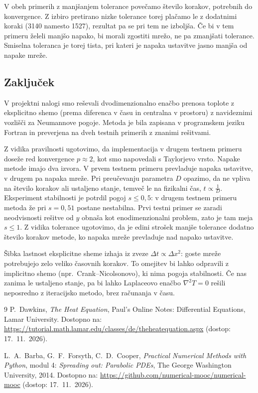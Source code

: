 \documentclass[a4paper,11pt]{article}
\begin{document}
	V obeh primerih z manjšanjem tolerance povečamo število korakov, potrebnih do konvergence. Z izbiro pretirano nizke tolerance torej plačamo le z dodatnimi koraki (3140 namesto 1527), rezultat pa se pri tem ne izboljša. Če bi v tem primeru želeli manjšo napako, bi morali zgostiti mrežo, ne pa zmanjšati tolerance. Smiselna toleranca je torej tista, pri kateri je napaka ustavitve jasno manjša od napake mreže.
	
	\subsection{Zaključek}
	
	V projektni nalogi smo reševali dvodimenzionalno enačbo prenosa toplote z eksplicitno shemo (prema diferenca v času in centralna v prostoru) z navideznimi vozlišči za Neumannove pogoje. Metoda je bila zapisana v programskem jeziku Fortran in preverjena na dveh testnih primerih z znanimi rešitvami.
	
	Z vidika pravilnosti ugotovimo, da implementacija v drugem testnem primeru doseže red konvergence $p \approx 2$, kot smo napovedali s Taylorjevo vrsto. Napake metode imajo dva izvora. V prvem testnem primeru prevladuje napaka ustavitve, v drugem pa napaka mreže. Pri preučevanju parametra $D$ opazimo, da ne vpliva na število korakov ali ustaljeno stanje, temveč le na fizikalni čas, $t \propto \frac{1}{D}$. Eksperiment stabilnosti je potrdil pogoj $s \leq 0{,}5$: v drugem testnem primeru metoda že pri $s = 0{,}51$ postane nestabilna. Prvi testni primer se zaradi neodvisnosti rešitve od $y$ obnaša kot enodimenzionalni problem, zato je tam meja $s \leq 1$. Z vidika tolerance ugotovimo, da je edini strošek manjše tolerance dodatno število korakov metode, ko napaka mreže prevladuje nad napako ustavitve.
	
	Šibka lastnost eksplicitne sheme izhaja iz zveze $\Delta t \propto \Delta x^2$: goste mreže potrebujejo zelo veliko časovnih korakov. To omejitev bi lahko odpravili z implicitno shemo (npr.\ Crank--Nicolsonovo), ki nima pogoja stabilnosti. Če nas zanima le ustaljeno stanje, pa bi lahko Laplaceovo enačbo $\nabla^2 T = 0$ rešili neposredno z iteracijsko metodo, brez računanja v času.
	
	\newpage
	\begin{thebibliography}{9}
		P.~Dawkins, \emph{The Heat Equation}, Paul's Online Notes: Differential Equations, Lamar University.
		Dostopno na: \url{https://tutorial.math.lamar.edu/classes/de/theheatequation.aspx}
		(dostop: 17.~11.~2026).
		
		L.~A.~Barba, G.~F.~Forsyth, C.~D.~Cooper, \emph{Practical Numerical Methods with Python}, 
		modul 4: \emph{Spreading out: Parabolic PDEs}, The George Washington University, 2014.
		Dostopno na: \url{https://github.com/numerical-mooc/numerical-mooc}
		(dostop: 17.~11.~2026).
	\end{thebibliography}
	
	
\end{document}
